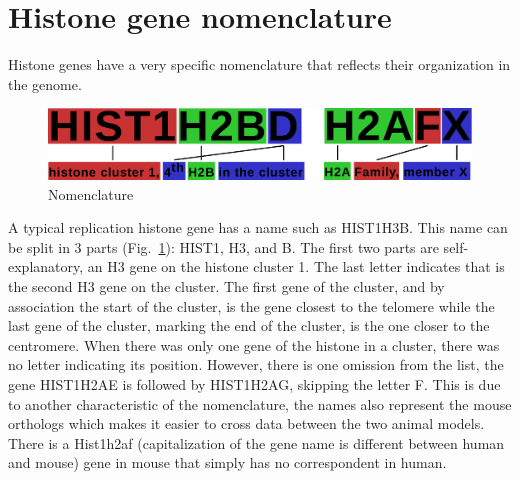 \documentclass[10pt,a4paper,draft]{article}
\newcommand{\rewrite}[2][]{\todo[inline,color=green!40,#1]{#2}}       %
\begin{document}

  \section{Histone gene nomenclature}
  \label{sec:nomenclature}
    Histone genes have a very specific nomenclature that reflects their organization in the genome.

    \begin{figure}
      \centering
      \includegraphics[width=\textwidth]{nomenclature-schematic.pdf}
      \caption{Nomenclature}
      \label{fig:nomenclature}
    \end{figure}

    A typical replication histone gene has a name such as HIST1H3B. This name can be split in
    3 parts (Fig.~\ref{fig:nomenclature}): HIST1, H3, and B. The first two parts are self-explanatory,
    an H3 gene on the histone cluster 1. The last letter indicates that is the second H3 gene on the cluster.
    The first gene of the cluster, and by association the start of the cluster, is the gene closest to the telomere
    while the last gene of the cluster, marking the end of the cluster, is the one closer to the centromere. When
    there was only one gene of the histone in a cluster, there was no letter indicating its position. However, there is
    one omission from the list, the gene HIST1H2AE is followed by HIST1H2AG, skipping the letter F. This is due
    to another characteristic of the nomenclature, the names also represent the mouse orthologs which makes it easier
    to cross data between the two animal models. There is a Hist1h2af (capitalization
    of the gene name is different between human and mouse) gene in mouse that simply has no correspondent in human.
\end{document}
